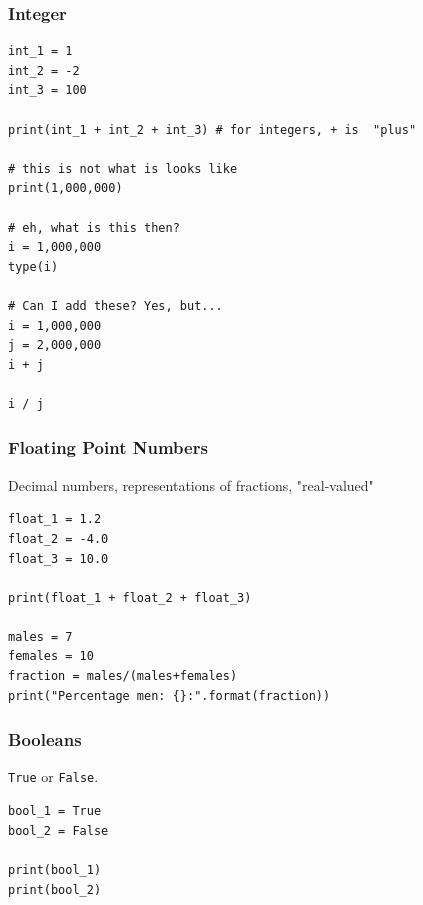 \begin{frame}[fragile]\frametitle{Integer}
\begin{lstlisting}
int_1 = 1
int_2 = -2
int_3 = 100

print(int_1 + int_2 + int_3) # for integers, + is  "plus"

# this is not what is looks like
print(1,000,000)

# eh, what is this then?
i = 1,000,000
type(i)

# Can I add these? Yes, but...
i = 1,000,000
j = 2,000,000
i + j

i / j
\end{lstlisting}
\end{frame}

\begin{frame}[fragile]\frametitle{Floating Point Numbers}
Decimal numbers, representations of fractions, "real-valued"
\begin{lstlisting}
float_1 = 1.2
float_2 = -4.0
float_3 = 10.0

print(float_1 + float_2 + float_3)

males = 7
females = 10
fraction = males/(males+females)
print("Percentage men: {}:".format(fraction))
\end{lstlisting}
\end{frame}

\begin{frame}[fragile]\frametitle{Booleans}
\texttt{True} or \texttt{False}.
\begin{lstlisting}
bool_1 = True 
bool_2 = False

print(bool_1)
print(bool_2)
\end{lstlisting}
\end{frame}


